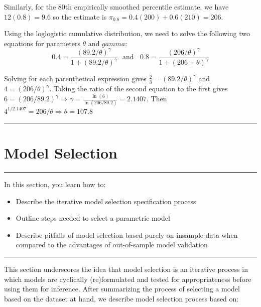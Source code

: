 \documentclass[]{book}
\providecommand{\tightlist}{%
  \setlength{\itemsep}{0pt}\setlength{\parskip}{0pt}}
\theoremstyle{definition}
\theoremstyle{definition}
\theoremstyle{definition}
\theoremstyle{remark}
\begin{document}
Similarly, for the 80th empirically smoothed percentile estimate, we
have \(12(0.8)=9.6\) so the estimate is
\(\hat{\pi}_{0.8} = 0.4(200)+0.6(210)=206\).

Using the loglogistic cumulative distribution, we need to solve the
following two equations for parameters \(\theta\) and \(gamma\):
\[0.4=\frac{(89.2/\theta)^\gamma}{1+(89.2/\theta)^\gamma} \ \ \ \text{and} \ \ \ \   0.8=\frac{(206/\theta)^\gamma}{1+(206+\theta)^\gamma}\]

Solving for each parenthetical expression gives
\(\frac{2}{3}=(89.2/\theta)^\gamma\) and \(4=(206/\theta)^\gamma\).
Taking the ratio of the second equation to the first gives
\(6=(206/89.2)^\gamma \Rightarrow \gamma=\frac{\ln(6)}{\ln(206/89.2)} = 2.1407\).
Then \(4^{1/2.1407}=206/\theta \Rightarrow \theta=107.8\)

\begin{center}\rule{0.5\linewidth}{\linethickness}\end{center}

\section{Model Selection}\label{S:MS:ModelSelection}

\begin{center}\rule{0.5\linewidth}{\linethickness}\end{center}

In this section, you learn how to:

\begin{itemize}
\tightlist
\item
  Describe the iterative model selection specification process
\item
  Outline steps needed to select a parametric model
\item
  Describe pitfalls of model selection based purely on insample data
  when compared to the advantages of out-of-sample model validation
\end{itemize}

\begin{center}\rule{0.5\linewidth}{\linethickness}\end{center}

This section underscores the idea that model selection is an iterative
process in which models are cyclically (re)formulated and tested for
appropriateness before using them for inference. After summarizing the
process of selecting a model based on the dataset at hand, we describe
model selection process based on:
\end{document}
